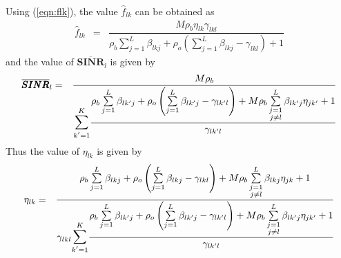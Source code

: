 \documentclass[10pt, a4paper, twoside,fleqn]{article}
\begin{document}
Using (\ref{eqn:flk}), the value $\hat f_{lk}$ can be obtained as
\begin{eqnarray}
\hat f_{lk} &=& \dfrac{M\rho_b\eta_{lk}\gamma_{lkl}}{ \rho_b\sum\limits_{j=1}^{L}\beta_{lkj}+\rho_o\left(\sum\limits_{j=1}^{L}\beta_{lkj} -\gamma_{lkl}\right)+1}
\end{eqnarray}
and the value of $\overline{\pmb{SINR}}_{l}$ is given by
\begin{eqnarray}\label{eqn:sinrbarbt}
\overline{\pmb{SINR}}_{l} &=& \frac{M\rho_b}{\mathlarger{\mathlarger{\sum}}\limits_{k'=1}^{K}\cfrac{\rho_b\sum\limits_{j=1}^{L}\beta_{lk'j}+\rho_o\left(\sum\limits_{j=1}^{L}\beta_{lk'j} -\gamma_{lk'l}\right)+M\rho_b\sum\limits_{\substack{j=1 \\ j \neq l}}^{L}\beta_{lk'j}\eta_{jk'}+1}{\gamma_{lk'l}}}
\end{eqnarray}
Thus the value of $\eta_{lk}$ is given by
\begin{eqnarray}
\eta_{lk} &=& \frac{\rho_b\sum\limits_{j=1}^{L}\beta_{lkj}+\rho_o\left(\sum\limits_{j=1}^{L}\beta_{lkj} -\gamma_{lkl}\right)+M\rho_b\sum\limits_{\substack{j=1 \\ j \neq l}}^{L}\beta_{lkj}\eta_{jk}+1}{\gamma_{lkl}\mathlarger{\mathlarger{\sum}}\limits_{k'=1}^{K}\cfrac{\rho_b\sum\limits_{j=1}^{L}\beta_{lk'j}+\rho_o\left(\sum\limits_{j=1}^{L}\beta_{lk'j} -\gamma_{lk'l}\right)+M\rho_b\sum\limits_{\substack{j=1 \\ j \neq l}}^{L}\beta_{lk'j}\eta_{jk'}+1}{\gamma_{lk'l}}}
\end{eqnarray}
%
  
\end{document}
